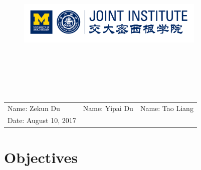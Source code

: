 \documentclass[12pt]{article}
\begin{document}
\thispagestyle{empty}
\vspace*{-2em}
\begin{figure}[H]
\centering
\includegraphics[width=0.8\textwidth]{LOGO}
\end{figure}
\vspace*{-2em}
\noindent \hrulefill
\vspace{12em}


\begin{center}

\begin{huge}
\end{huge}\\
\vspace*{1cm}
\begin{huge}
\end{huge}\\
\vspace*{1cm}
\begin{huge}
\end{huge}\\

\vspace*{2cm}
\end{center}


\vfill
\noindent\hrulefill
\begin{table}[h!]
\flushleft
\begin{tabular}{lll}
Name: Zekun Du \hspace*{2em}&
Name: Yipai Du \hspace*{2em}&
Name: Tao Liang\hspace*{2em}\\
Date: August 10, 2017\\
\end{tabular}
\end{table}
\vspace{-4em}

\newpage
\tableofcontents

\newpage
\section{Objectives}
\end{document}
